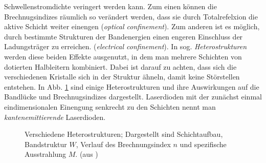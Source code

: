 Schwellenstromdichte veringert werden kann. Zum einen können die
Brechnugsindizes räumlich so verändert werden, dass sie durch Totalrefelxion die
aktive Schicht weiter einengen (\textit{optical confinement}). Zum anderen ist
es möglich, durch bestimmte Strukturen der Bandenergien einen engeren Einschluss
der Ladungsträger zu erreichen. (\textit{electrical confinement}). In sog.
\textit{Heterostrukturen} werden diese beiden Effekte ausgenutzt, in dem man
mehrere Schichten von dotierten Halbleitern kombiniert. Dabei ist darauf zu
achten, dass sich die verschiedenen Kristalle sich in der Struktur ähneln, damit
keine Störstellen entstehen. In Abb. \ref {fig:heterostrukturen} sind einige
Heterostrukturen und ihre Auswirkungen auf die Bandlücke und Brechnugsindizes
dargestellt. Laserdioden mit der zunächst einmal eindimensionalen Einengung
senkrecht zu den Schichten nennt man \textit{kantenemittierende} Laserdioden.
\begin{figure}[h]
	\centering
	\caption[Heterostrukturen]{Verschiedene Heterostrukturen;
	Dargestellt sind Schichtaufbau,
	Bandstruktur $W$, Verlauf des Brechnungsindex $n$ 
	und spezifische Ausstrahlung $M$. (aus
	\cite{schumann:2001:diplomarbeit})}\label{fig:heterostrukturen}
\end{figure}

